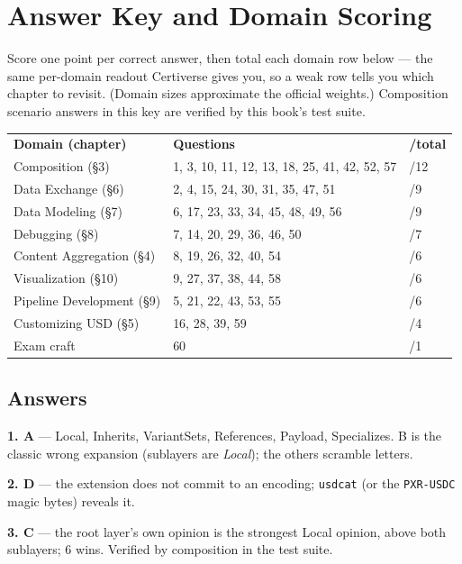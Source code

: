 \clearpage
\section*{Answer Key and Domain Scoring}
\label{ch:mockkey}

Score one point per correct answer, then total each domain row below ---
the same per-domain readout Certiverse gives you, so a weak row tells you
which chapter to revisit. (Domain sizes approximate the official weights.)
Composition scenario answers in this key are verified by this book's test
suite.

\begin{center}
\begin{tabular}{@{}p{1.75in}p{2.0in}p{0.55in}@{}}
\textbf{\sffamily Domain (chapter)} & \textbf{\sffamily Questions} & \textbf{\sffamily /total} \\[2pt]
Composition (\S3) & 1, 3, 10, 11, 12, 13, 18, 25, 41, 42, 52, 57 & /12 \\
Data Exchange (\S6) & 2, 4, 15, 24, 30, 31, 35, 47, 51 & /9 \\
Data Modeling (\S7) & 6, 17, 23, 33, 34, 45, 48, 49, 56 & /9 \\
Debugging (\S8) & 7, 14, 20, 29, 36, 46, 50 & /7 \\
Content Aggregation (\S4) & 8, 19, 26, 32, 40, 54 & /6 \\
Visualization (\S10) & 9, 27, 37, 38, 44, 58 & /6 \\
Pipeline Development (\S9) & 5, 21, 22, 43, 53, 55 & /6 \\
Customizing USD (\S5) & 16, 28, 39, 59 & /4 \\
Exam craft & 60 & /1 \\
\end{tabular}
\end{center}

\subsection*{Answers}

\noindent\textbf{1. A} --- Local, Inherits, VariantSets, References,
Payload, Specializes. B is the classic wrong expansion (sublayers are
\emph{Local}); the others scramble letters.

\noindent\textbf{2. D} --- the extension does not commit to an encoding;
\texttt{usdcat} (or the \texttt{PXR-USDC} magic bytes) reveals it.

\noindent\textbf{3. C} --- the root layer's own opinion is the strongest
Local opinion, above both sublayers; 6 wins. Verified by composition in the
test suite.

